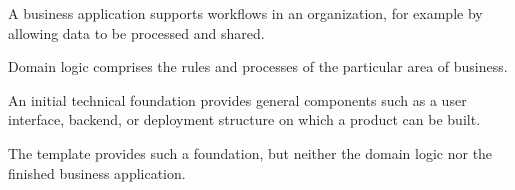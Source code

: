 \begin{beginnerstatement}

A business application supports workflows in an organization, for example by
allowing data to be processed and shared.

Domain logic comprises the rules and processes of the particular area of
business.

An initial technical foundation provides general components such as a user
interface, backend, or deployment structure on which a product can be built.

The template provides such a foundation, but neither the domain logic nor the
finished business application.

\end{beginnerstatement}

